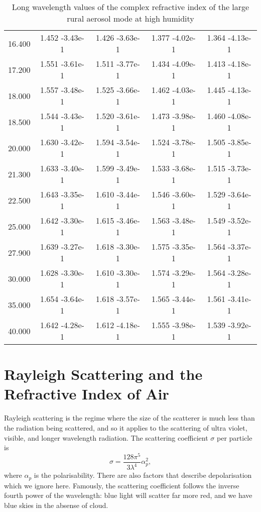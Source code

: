 \documentclass[12pt]{article}
\begin{document}
\begin{center}
\begin{table}
\begin{tabular}{| c | c | c | c | c |  }
16.400  &   1.452   -3.43e-1 &   1.426   -3.63e-1  &  1.377   -4.02e-1  &  1.364   -4.13e-1  \\
17.200  &   1.551   -3.61e-1  &  1.511   -3.77e-1 &   1.434   -4.09e-1 &   1.413   -4.18e-1  \\
18.000  &   1.557   -3.48e-1 &   1.525   -3.66e-1 &   1.462   -4.03e-1 &   1.445   -4.13e-1  \\
18.500  &   1.544   -3.43e-1 &   1.520   -3.61e-1 &   1.473   -3.98e-1 &   1.460   -4.08e-1  \\
20.000  &   1.630   -3.42e-1 &   1.594   -3.54e-1  &  1.524   -3.78e-1 &   1.505   -3.85e-1  \\
21.300  &   1.633   -3.40e-1  &  1.599   -3.49e-1 &   1.533   -3.68e-1 &   1.515   -3.73e-1  \\
22.500  &   1.643   -3.35e-1  &  1.610   -3.44e-1 &   1.546   -3.60e-1  &  1.529   -3.64e-1  \\
25.000  &   1.642   -3.30e-1  &  1.615   -3.46e-1 &   1.563   -3.48e-1  &  1.549   -3.52e-1  \\
27.900  &   1.639   -3.27e-1  &  1.618   -3.30e-1 &   1.575   -3.35e-1  &  1.564   -3.37e-1  \\
30.000  &   1.628   -3.30e-1 &   1.610   -3.30e-1 &   1.574   -3.29e-1  &  1.564   -3.28e-1  \\
35.000  &   1.654   -3.64e-1 &   1.618   -3.57e-1  &  1.565   -3.44e-1  &  1.561   -3.41e-1  \\
40.000  &   1.642   -4.28e-1 &   1.612   -4.18e-1  &  1.555   -3.98e-1  &  1.539   -3.92e-1 \\
\hline
\end{tabular}
\caption{Long wavelength values of the complex refractive index of the large rural aerosol mode at high humidity}
\end{table}
\end{center}

\section{Rayleigh Scattering and the Refractive Index of Air}

Rayleigh scattering is the regime where the size of the scatterer is much less than the radiation
being scattered, and so it applies to the scattering of ultra violet, visible, and longer wavelength
radiation. The scattering coefficient $\sigma$ per particle is
\begin{equation}
\sigma=\frac{128 \pi^5}{3 \lambda^4} \alpha_p^2,
\end{equation}
where $\alpha_p$ is the polarisability. There are also
 factors that describe depolarisation \cite{Chandrasekhar:Mybib}
 which we ignore here. Famously, the scattering coefficient follows the inverse fourth power
of the wavelength: blue light will scatter far more red, and we have blue skies in the absense of
cloud.
\end{document}
